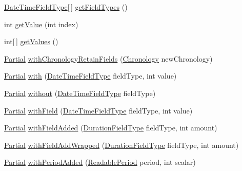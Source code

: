 \begin{DoxyCompactItemize}
\item 
\hyperlink{classorg_1_1joda_1_1time_1_1_date_time_field_type}{Date\-Time\-Field\-Type}\mbox{[}$\,$\mbox{]} \hyperlink{classorg_1_1joda_1_1time_1_1_partial_abba1c7a04b552e7bea28a221847052ed}{get\-Field\-Types} ()
\item 
int \hyperlink{classorg_1_1joda_1_1time_1_1_partial_a6ad1176a09de5f07903bc72ce702dab4}{get\-Value} (int index)
\item 
int\mbox{[}$\,$\mbox{]} \hyperlink{classorg_1_1joda_1_1time_1_1_partial_a7f5049f24807743c6b186d1b18069dc4}{get\-Values} ()
\item 
\hyperlink{classorg_1_1joda_1_1time_1_1_partial}{Partial} \hyperlink{classorg_1_1joda_1_1time_1_1_partial_aff74951682c630d0ce7885f5377e31f6}{with\-Chronology\-Retain\-Fields} (\hyperlink{classorg_1_1joda_1_1time_1_1_chronology}{Chronology} new\-Chronology)
\item 
\hyperlink{classorg_1_1joda_1_1time_1_1_partial}{Partial} \hyperlink{classorg_1_1joda_1_1time_1_1_partial_aa126124b32086b74657b1da1b4086ec5}{with} (\hyperlink{classorg_1_1joda_1_1time_1_1_date_time_field_type}{Date\-Time\-Field\-Type} field\-Type, int value)
\item 
\hyperlink{classorg_1_1joda_1_1time_1_1_partial}{Partial} \hyperlink{classorg_1_1joda_1_1time_1_1_partial_a0a5a826913f0eaba1f51c5d429916ff4}{without} (\hyperlink{classorg_1_1joda_1_1time_1_1_date_time_field_type}{Date\-Time\-Field\-Type} field\-Type)
\item 
\hyperlink{classorg_1_1joda_1_1time_1_1_partial}{Partial} \hyperlink{classorg_1_1joda_1_1time_1_1_partial_af12ecc345b69407a8282fa3bd219c393}{with\-Field} (\hyperlink{classorg_1_1joda_1_1time_1_1_date_time_field_type}{Date\-Time\-Field\-Type} field\-Type, int value)
\item 
\hyperlink{classorg_1_1joda_1_1time_1_1_partial}{Partial} \hyperlink{classorg_1_1joda_1_1time_1_1_partial_a9c34eca1072f085c9cd2951ad0bb0b69}{with\-Field\-Added} (\hyperlink{classorg_1_1joda_1_1time_1_1_duration_field_type}{Duration\-Field\-Type} field\-Type, int amount)
\item 
\hyperlink{classorg_1_1joda_1_1time_1_1_partial}{Partial} \hyperlink{classorg_1_1joda_1_1time_1_1_partial_a933ee148cf88f0401229e196da20c6fb}{with\-Field\-Add\-Wrapped} (\hyperlink{classorg_1_1joda_1_1time_1_1_duration_field_type}{Duration\-Field\-Type} field\-Type, int amount)
\item 
\hyperlink{classorg_1_1joda_1_1time_1_1_partial}{Partial} \hyperlink{classorg_1_1joda_1_1time_1_1_partial_a08fb4c7f7ca0bcbc72a8b4baea4615b6}{with\-Period\-Added} (\hyperlink{interfaceorg_1_1joda_1_1time_1_1_readable_period}{Readable\-Period} period, int scalar)

\end{DoxyCompactItemize}

